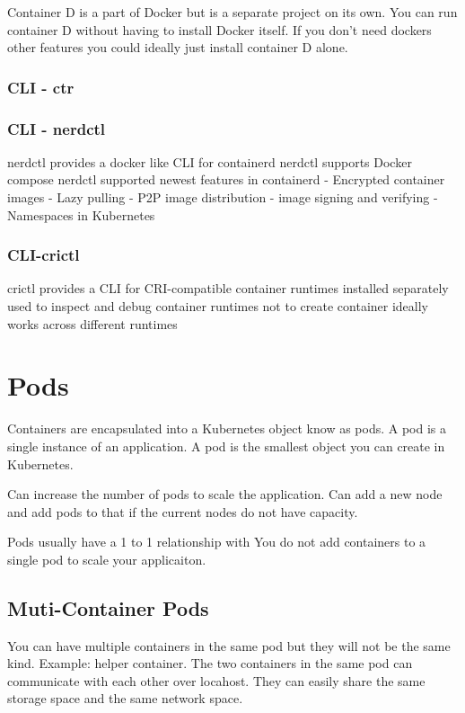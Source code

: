 \documentclass[11pt]{book}
\begin{document}
    Container D is a part of Docker but is a separate project on its own.
    You can run container D without having to install Docker itself.
    If you don't need dockers other features you could ideally just install container D alone.

    \subsubsection{CLI - ctr}

    \subsubsection{CLI - nerdctl}
    nerdctl provides a docker like CLI for containerd
    nerdctl supports Docker compose
    nerdctl supported newest features in containerd
    - Encrypted container images
    - Lazy pulling
    - P2P image distribution
    - image signing and verifying
    - Namespaces in Kubernetes

    \subsubsection{CLI-crictl}
    crictl provides a CLI for CRI-compatible container runtimes
    installed separately
    used to inspect and debug container runtimes
    not to create container ideally
    works across different runtimes



    \section{Pods}
    Containers are encapsulated into a Kubernetes object know as pods.
    A pod is a single instance of an application.
    A pod is the smallest object you can create in Kubernetes.

    Can increase the number of pods to scale the application.
    Can add a new node and add pods to that if the current nodes do not have capacity.

    Pods usually have a 1 to 1 relationship with
    You do not add containers to a single pod to scale your applicaiton.

    \subsection{Muti-Container Pods}
    You can have multiple containers in the same pod but they will not be the same kind.
    Example: helper container. The two containers in the same pod can communicate with each other over locahost.
    They can easily share the same storage space and the same network space.
\end{document}
